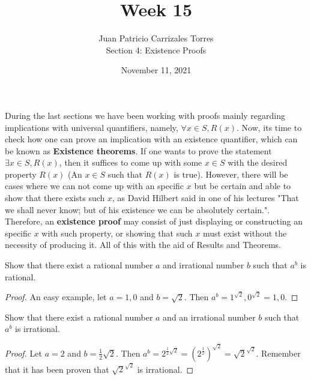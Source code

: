 \documentclass[12pt]{article}
\newenvironment{problem}[2][Problem]{\begin{trivlist}
		\item[\hskip \labelsep {\bfseries #1}\hskip \labelsep {\bfseries #2.}]}{\end{trivlist}}
\begin{document}
	
	\title{Week 15}
	\author{Juan Patricio Carrizales Torres \\
		Section 4: Existence Proofs}
	\date{November 11, 2021}
	\maketitle

	During the last sections we have been working with proofs  mainly regarding implications with universal quantifiers, namely, $\forall x\in S, R(x)$. Now, its time to check how one can prove an implication with an existence quantifier, which can be known as \textbf{Existence theorems}. If one wants to prove the statement $\exists x\in S, R(x)$, then it suffices to come up with some $x\in S$ with the desired property $R(x)$ (An $x\in S$ such that $R(x)$ is true). However, there will be cases where we can not come up with an specific $x$ but be certain and able to show that there exists such $x$, as David Hilbert said in one of his lectures "That we shall never know; but of his existence we can be absolutely certain.".\\
	
	Therefore, an \textbf{existence proof} may consist of just displaying or constructing an specific $x$ with such property, or showing that such $x$ must exist without the necessity of producing it. All of this with the aid of Results and Theorems.
	
	\begin{problem}{40}
		Show that there exist a rational number $a$ and irrational number $b$ such that $a^{b}$ is rational.
		\begin{proof}
			An easy example, let $a = 1,0$ and $b = \sqrt{2}$. Then $a^{b} = 1^{\sqrt{2}}, 0^{\sqrt{2}} = 1, 0$.
		\end{proof}
	\end{problem} 

	\begin{problem}{41}
		Show that there exist a rational number $a$ and an irrational number $b$ such that $a^{b}$ is irrational.
		\begin{proof}
			Let $a = 2$ and $b = \frac{1}{2}\sqrt{2}$. Then $a^{b} = 2^{\frac{1}{2}\sqrt{2}} = \left(2^{\frac{1}{2}}\right)^{\sqrt{2}} = \sqrt{2}^{\sqrt{2}}$. Remember that it has been proven that $\sqrt{2}^{\sqrt{2}}$ is irrational. 
		\end{proof}
	\end{problem}
	
\end{document}
